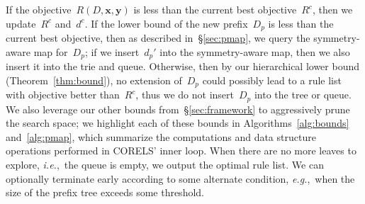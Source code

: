 \documentclass[twoside,11pt]{article}
\def\ie{{\it i.e.},~}
\def\eg{{\it e.g.},~}
\newcommand{\x}{\mathbf{x}}
\newcommand{\y}{\mathbf{y}}
\def\Prefix{d_p}
\def\RLB{{D}}
\def\PrefixB{D_p}
\def\Obj{R}
\def\CurrentObj{{R^c}}
\def\CurrentRL{d^c}
\begin{document}
If the objective~$\Obj(\RLB, \x, \y)$ is less than the current best objective~$\CurrentObj$,
then we update~$\CurrentObj$ and~$\CurrentRL$.
%
If the lower bound of the new prefix~$\PrefixB$ is less than the current best objective,
then as described in~\S\ref{sec:pmap}, we query the symmetry-aware map for~$\PrefixB$;
if we insert~$\Prefix'$ into the symmetry-aware map, then we also insert it into the trie and queue.
%
Otherwise, %
then by our hierarchical lower bound (Theorem~\ref{thm:bound}),
no extension of~$\PrefixB$ could possibly lead to a rule list with objective
better than~$\CurrentObj$, thus we do not insert~$\PrefixB$ into the tree or queue.
%
We also leverage our other bounds from~\S\ref{sec:framework}
to aggressively prune the search space; we highlight each of these bounds
in Algorithms~\ref{alg:bounds} and~\ref{alg:pmap},
which summarize the computations and data structure operations performed in CORELS' inner loop.
%
When there are no more leaves to explore, \ie the queue is empty, we output the optimal rule list.
%
We can optionally terminate early according to some alternate condition,
\eg when the size of the prefix tree exceeds some threshold.
\end{document}
